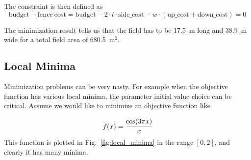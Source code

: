 The constraint is then defined as
\begin{equation*}
\mathrm{budget} - \mathrm{fence~cost} = \mathrm{budget} - 2\cdot l\cdot\mathrm{side\_cost} - w\cdot(\mathrm{up\_cost} + \mathrm{down\_cost}) = 0
\end{equation*}

The minimization result tells us that the field has to be 17.5~m long and 38.9~m wide for a total field area of 680.5~$\textrm{m}^2$.

\subsection{Local Minima}
Minimization problems can be very nasty.
For example when the objective function has various local minima, the parameter initial value choice can be critical. 
Assume we would like to minimize an objective function like 

\begin{equation*}
f(x) = \cfrac{\mathrm{cos}(3\pi x)}{x}
\end{equation*}
This function is plotted in Fig.~\ref{fig:local_minima} in the range $[0, 2]$, and clearly it has many minima. 

